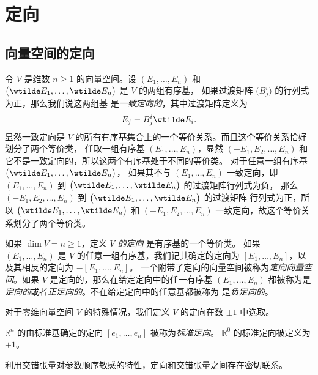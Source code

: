 \chapter{定向}

\section{向量空间的定向}

令 $V$ 是维数 $n\ge 1$ 的向量空间。设
$(E_1,\dots,E_n)$ 和 $\bigl(\wtilde E_1,\dots,\wtilde E_n\bigr)$
是 $V$ 的两组有序基，
如果过渡矩阵 $\bigl(B_j^i\bigr)$ 的行列式为正，那么我们说这两组基
是\emph{一致定向的}，其中过渡矩阵定义为
\[
  E_j=B^i_j\wtilde E_i.  
\]
显然一致定向是 $V$ 的所有有序基集合上的一个等价关系。而且这个等价关系恰好
划分了两个等价类，
任取一组有序基 $(E_1,\dots,E_n)$，显然 $(-E_1,E_2,\dots,E_n)$
和它不是一致定向的，所以这两个有序基处于不同的等价类。
对于任意一组有序基 $\bigl(\wtilde E_1,\dots,\wtilde E_n\bigr)$，
如果其不与 $(E_1,\dots,E_n)$ 一致定向，即 $(E_1,\dots,E_n)$
到 $\bigl(\wtilde E_1,\dots,\wtilde E_n\bigr)$ 的过渡矩阵行列式为负，
那么 $(-E_1,E_2,\dots,E_n)$ 到 $\bigl(\wtilde E_1,\dots,\wtilde E_n\bigr)$ 的过渡矩阵
行列式为正，所以 $\bigl(\wtilde E_1,\dots,\wtilde E_n\bigr)$ 和
$(-E_1,E_2,\dots,E_n)$ 一致定向，故这个等价关系划分了两个等价类。

如果 $\dim V=n\ge 1$，定义 \emph{$V$ 的定向} 是有序基的一个等价类。
如果 $(E_1,\dots,E_n)$ 是 $V$ 的任意一组有序基，我们记其确定的定向为
$[E_1,\dots,E_n]$，以及其相反的定向为 $-[E_1,\dots,E_n]$。
一个附带了定向的向量空间被称为\emph{定向向量空间}。如果 $V$
是定向的，那么在给定定向中的任一有序基 $(E_1,\dots,E_n)$ 都被称为是
\emph{定向的}或者\emph{正定向的}。不在给定定向中的任意基都被称为
是\emph{负定向的}。

对于零维向量空间 $V$ 的特殊情况，我们定义 $V$ 的定向在数 $\pm 1$
中选取。

\begin{example}
  $\mathbb{R}^n$ 的由标准基确定的定向 $[e_1,\dots,e_n]$ 被称为\emph{标准定向}。
  $\mathbb{R}^0$ 的标准定向被定义为 $+1$。
\end{example}

利用交错张量对参数顺序敏感的特性，定向和交错张量之间存在密切联系。

